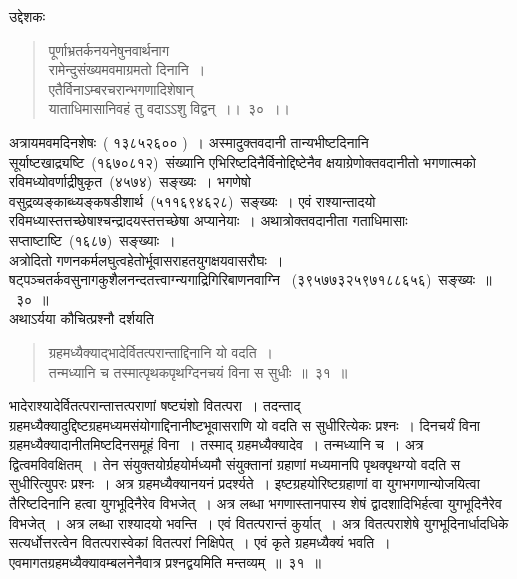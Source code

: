 \documentclass[11pt, openany]{book}
\begin{document}
\newpage
\thispagestyle{fancy}
\fancyhf{}

\indent
उद्देशकः\textendash

\begin{quote}
{\ku पूर्णाभ्रतर्कनयनेषुनवार्थनाग\textendash\\
रामेन्दुसंख्यमवमाग्रमतो दिनानि~।\\
एतैर्विनाऽम्बरचरान्भगणादिशेषान्\\
याताधिमासानिवहं तु वदाऽऽशु विद्वन्~।।~३०~।।}
\end{quote}

\indent
अत्रायमवमदिनशेषः~( १३८५२६०० )~। अस्मादुक्तवदानी तान्यभीष्टदिनानि सूर्याष्टखाद्र्यष्टि~(१६७०८१२)~संख्यानि एभिरिष्टदिनैर्विनोद्दिष्टेनैव क्षयाग्रेणोक्तवदानीतो भगणात्मको रविमध्योवर्णाद्रीषुकृत~(४५७४)~सङ्ख्यः~। भगणेषो वसुद्रव्यङ्काब्ध्यङ्कषडीशार्थ~(५११६९४६२८)~सङ्ख्यः~। एवं राश्यान्तादयो रविमध्यास्तत्तच्छेषाश्चन्द्रादयस्तत्तच्छेषा अप्यानेयाः~। अथात्रोक्तवदानीता गताधिमासाः सप्ताष्टाष्टि~(१६८७)~सङ्ख्याः~।\\
\indent
अत्रोदितो गणनकर्मलघुत्वहेतोर्भूवासराहतयुगक्षयवासरौघः~।
षट्पञ्चतर्कवसुनागकुशैलनन्दतत्त्वाग्न्यगाद्रिगिरिबाणनवाग्नि
~(३९५७७३२५९७१८८६५६)~सङ्ख्यः~॥~३०~॥\\

\indent
अथाऽर्यया कौचित्प्रश्नौ दर्शयति\textendash

\begin{quote}
{\ks ग्रहमध्यैक्याद्भादेर्वितत्परान्ताद्दिनानि यो वदति~।\\
तन्मध्यानि च तस्मात्पृथकपृथग्दिनचयं विना स सुधीः~॥~३१~॥}
\end{quote}

\indent
भादेराश्यादेर्वितत्परान्तात्तत्पराणां षष्ट्यंशो वितत्परा~। तदन्ताद्
ग्रहमध्यैक्यादुद्दिष्टग्रहमध्यमसंयोगाद्दिनानीष्टभूवासराणि यो वदति स सुधीरित्येकः प्रश्नः~। दिनचर्यं विना ग्रहमध्यैक्यादानीतमिष्टदिनसमूहं विना~। तस्माद् ग्रहमध्यैक्यादेव~। तन्मध्यानि च~। अत्र द्वित्वमविवक्षितम्~। तेन संयुक्तयोर्ग्रहयोर्मध्यमौ संयुक्तानां ग्रहाणां मध्यमानपि पृथक्पृथग्यो वदति स सुधीरित्युपरः प्रश्नः~। अत्र ग्रहमध्यैक्यानयनं प्रदर्श्यते~। इष्टग्रहयोरिष्टग्रहाणां वा युगभगणान्योजयित्वा तैरिष्टदिनानि हत्वा युगभूदिनैरेव विभजेत्~। अत्र लब्धा भगणास्तानपास्य शेषं द्वादशादिभिर्हत्वा युगभूदिनैरेव विभजेत्~। अत्र लब्धा राश्यादयो भवन्ति~। एवं वितत्परान्तं कुर्यात्~। अत्र वितत्पराशेषे युगभूदिनार्धादधिके सत्यर्धोत्तरत्वेन वितत्परास्वेकां वितत्परां निक्षिपेत्~। एवं कृते ग्रहमध्यैक्यं भवति~। एवमागतग्रहमध्यैक्यावम्बलनेनैवात्र प्रश्नद्वयमिति मन्तव्यम्~॥~३१~॥
\end{document}
